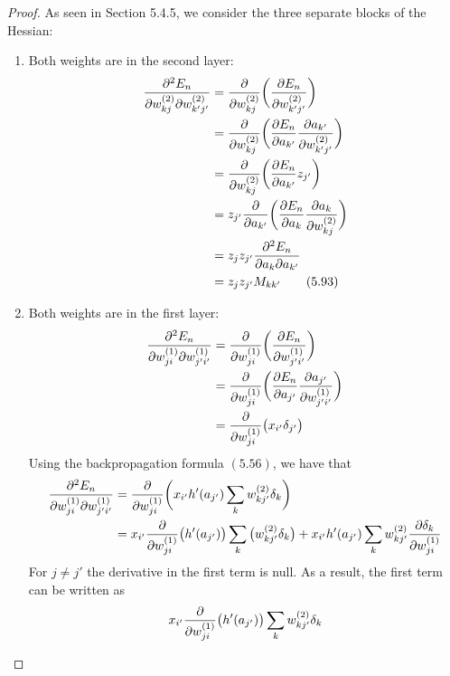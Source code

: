 \begin{proof}
    As seen in Section 5.4.5, we consider the three separate blocks of the Hessian:
    \begin{enumerate}
        \item Both weights are in the second layer:
            \begin{align*}
                \pdv{E_n}{w_{kj}^{(2)}}{w_{k'j'}^{(2)}} 
                &= \pdv{w_{kj}^{(2)}} \bigg(\pdv{E_n}{w_{k'j'}^{(2)}}\bigg) \\
                &= \pdv{w_{kj}^{(2)}} \bigg(\pdv{E_n}{a_{k'}} \pdv{a_{k'}}{w_{k'j'}^{(2)}}\bigg) \\
                &= \pdv{w_{kj}^{(2)}} \bigg(\pdv{E_n}{a_{k'}} z_{j'}\bigg) \\
                &= z_{j'} \pdv{a_{k'}} \bigg(\pdv{E_n}{a_k} \pdv{a_k}{w_{kj}^{(2)}}\bigg) \\
                &= z_{j}z_{j'} \pdv{E_n}{a_k}{a_{k'}} \\
                &= z_j z_{j'} M_{kk'} \tag{5.93}\label{eq:5.93}
            \end{align*}
        \item Both weights are in the first layer:
            \begin{align*}
                \pdv{E_n}{w_{ji}^{(1)}}{w_{j'i'}^{(1)}}
                &= \pdv{w_{ji}^{(1)}} \bigg(\pdv{E_n}{w_{j'i'}^{(1)}}\bigg) \\
                &= \pdv{w_{ji}^{(1)}} \bigg(\pdv{E_n}{a_{j'}} \pdv{a_{j'}}{w_{j'i'}^{(1)}}\bigg) \\
                &= \pdv{w_{ji}^{(1)}} \big(x_{i'} \delta_{j'}\big)
            \end{align*}
        Using the backpropagation formula $(5.56)$, we have that
        \begin{align*}
                \pdv{E_n}{w_{ji}^{(1)}}{w_{j'i'}^{(1)}}
                &= \pdv{w_{ji}^{(1)}} \bigg(x_{i'} h'(a_{j'}) \sum_{k} w_{kj'}^{(2)} \delta_k\bigg) \\
                &= x_{i'} \pdv{w_{ji}^{(1)}} \big(h'(a_{j'})\big)\sum_{k} \big(w_{kj'}^{(2)} \delta_k\big) +
                    x_{i'} h'(a_{j'}) \sum_{k} w_{kj'}^{(2)} \pdv{\delta_k}{w_{ji}^{(1)}}
        \end{align*}
        For $j \neq j'$ the derivative in the first term is null. As a result, the first term
        can be written as
        \begin{align*}
            x_{i'} \pdv{w_{ji}^{(1)}} \big(h'(a_{j'})\big) \sum_{k} w_{kj'}^{(2)} \delta_k

\end{align*}
\end{enumerate}
\end{proof}
